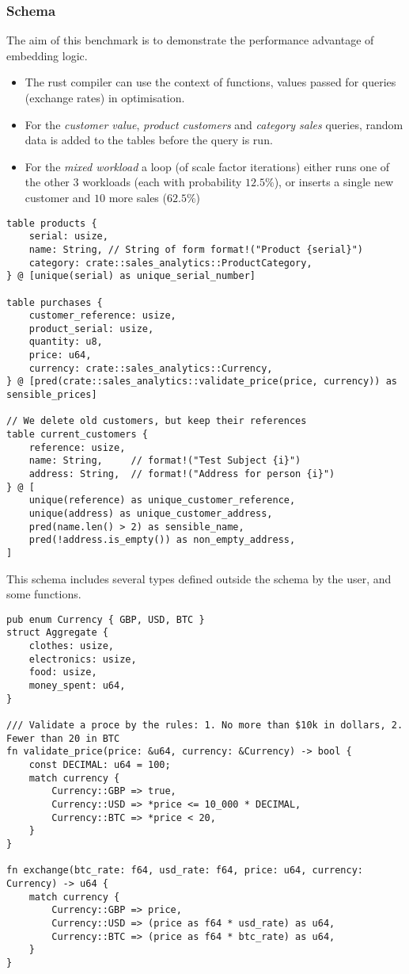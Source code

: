 \subsubsection{Schema}
The aim of this benchmark is to demonstrate the performance advantage of embedding logic.
\begin{itemize}
    \setlength\itemsep{0em}
    \item The rust compiler can use the context of functions, values passed for queries (exchange rates) in optimisation.
    \item For the \textit{customer value}, \textit{product customers} and \textit{category sales} queries, random data is added to the tables before the query is run.
    \item For the \textit{mixed workload} a loop (of scale factor iterations) either runs one of the other 3 workloads (each with probability $12.5\%$), or inserts a single new customer and $10$ more sales ($62.5\%$)
\end{itemize}
\begin{verbatim}
table products {
    serial: usize,
    name: String, // String of form format!("Product {serial}")
    category: crate::sales_analytics::ProductCategory,
} @ [unique(serial) as unique_serial_number]

table purchases {
    customer_reference: usize,
    product_serial: usize,
    quantity: u8,
    price: u64,
    currency: crate::sales_analytics::Currency,
} @ [pred(crate::sales_analytics::validate_price(price, currency)) as sensible_prices]

// We delete old customers, but keep their references
table current_customers {
    reference: usize,
    name: String,     // format!("Test Subject {i}")
    address: String,  // format!("Address for person {i}")
} @ [
    unique(reference) as unique_customer_reference,
    unique(address) as unique_customer_address,
    pred(name.len() > 2) as sensible_name,
    pred(!address.is_empty()) as non_empty_address,
]
\end{verbatim}
This schema includes several types defined outside the schema by the user, and some functions.
\begin{verbatim}
pub enum Currency { GBP, USD, BTC }
struct Aggregate {
    clothes: usize,
    electronics: usize,
    food: usize,
    money_spent: u64,
}

/// Validate a proce by the rules: 1. No more than $10k in dollars, 2. Fewer than 20 in BTC
fn validate_price(price: &u64, currency: &Currency) -> bool {
    const DECIMAL: u64 = 100;
    match currency {
        Currency::GBP => true,
        Currency::USD => *price <= 10_000 * DECIMAL,
        Currency::BTC => *price < 20,
    }
}

fn exchange(btc_rate: f64, usd_rate: f64, price: u64, currency: Currency) -> u64 {
    match currency {
        Currency::GBP => price,
        Currency::USD => (price as f64 * usd_rate) as u64,
        Currency::BTC => (price as f64 * btc_rate) as u64,
    }
}
\end{verbatim}
